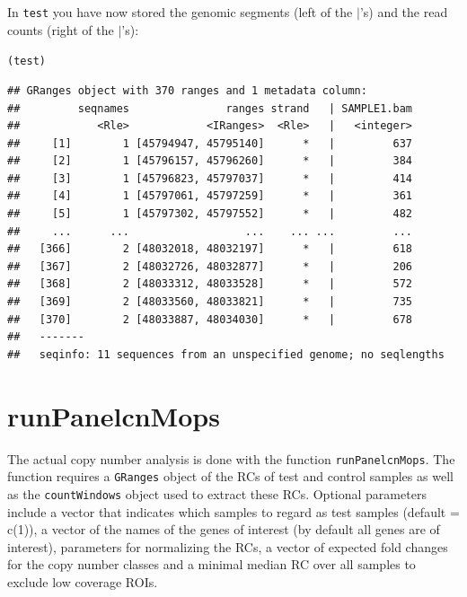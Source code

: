 \documentclass[article]{bioinf}\usepackage[]{graphicx}\usepackage[]{color}
\makeatletter
\newcommand{\hlstd}[1]{\textcolor[rgb]{0.345,0.345,0.345}{#1}}%
\newenvironment{kframe}{%
 \def\at@end@of@kframe{}%
 \ifinner\ifhmode%
  \def\at@end@of@kframe{\end{minipage}}%
  \begin{minipage}{\columnwidth}%
 \fi\fi%
 \def\FrameCommand##1{\hskip\@totalleftmargin \hskip-\fboxsep
 \colorbox{shadecolor}{##1}\hskip-\fboxsep
     \hskip-\linewidth \hskip-\@totalleftmargin \hskip\columnwidth}%
 \MakeFramed {\advance\hsize-\width
   \@totalleftmargin\z@ \linewidth\hsize
   \@setminipage}}%
 {\par\unskip\endMakeFramed%
 \at@end@of@kframe}
\newenvironment{knitrout}{}{} %
\makeatother
\begin{document}
In \verb+test+ you have now stored the genomic segments (left of the
$\mid$'s) and the read counts (right of the $\mid$'s):
\begin{knitrout}
\color{fgcolor}\begin{kframe}
\begin{alltt}
\hlstd{(test)}
\end{alltt}
\begin{verbatim}
## GRanges object with 370 ranges and 1 metadata column:
##         seqnames               ranges strand   | SAMPLE1.bam
##            <Rle>            <IRanges>  <Rle>   |   <integer>
##     [1]        1 [45794947, 45795140]      *   |         637
##     [2]        1 [45796157, 45796260]      *   |         384
##     [3]        1 [45796823, 45797037]      *   |         414
##     [4]        1 [45797061, 45797259]      *   |         361
##     [5]        1 [45797302, 45797552]      *   |         482
##     ...      ...                  ...    ... ...         ...
##   [366]        2 [48032018, 48032197]      *   |         618
##   [367]        2 [48032726, 48032877]      *   |         206
##   [368]        2 [48033312, 48033528]      *   |         572
##   [369]        2 [48033560, 48033821]      *   |         735
##   [370]        2 [48033887, 48034030]      *   |         678
##   -------
##   seqinfo: 11 sequences from an unspecified genome; no seqlengths
\end{verbatim}
\end{kframe}
\end{knitrout}

\section{runPanelcnMops}
\label{s:panelcn.mops}
The actual copy number analysis is done with the function \verb+runPanelcnMops+.
The function requires a \verb+GRanges+ object of the RCs of test and control 
samples as well as the \verb+countWindows+ object used to extract these RCs.
Optional parameters include a vector that indicates which samples to regard as 
test samples (default = c(1)), a vector of the names of the genes of interest 
(by default all genes are of interest), parameters for normalizing the RCs, 
a vector of expected fold changes for the copy number classes and a minimal 
median RC over all samples to exclude low coverage ROIs.
\end{document}
